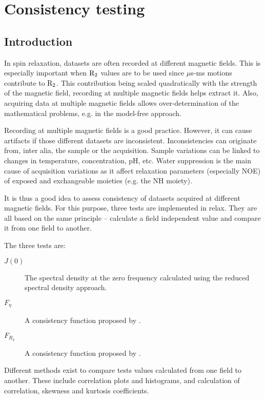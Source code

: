 
\chapter{Consistency testing}



\section{Introduction}

In spin relaxation, datasets are often recorded at different magnetic fields.  This is especially important when $\mathrm{R}_2$ values are to be used since $\mu$s-ms motions contribute to $\mathrm{R}_2$.  This contribution being scaled quadratically with the strength of the magnetic field, recording at multiple magnetic fields helps extract it.  Also, acquiring data at multiple magnetic fields allows over-determination of the mathematical problems, e.g. in the model-free approach.

Recording at multiple magnetic fields is a good practice.  However, it can cause artifacts if those different datasets are inconsistent.  Inconsistencies can originate from, inter alia, the sample or the acquisition.  Sample variations can be linked to changes in temperature, concentration, pH, etc.  Water suppression is the main cause of acquisition variations as it affect relaxation parameters (especially NOE) of exposed and exchangeable moieties (e.g. the NH moiety).

It is thus a good idea to assess consistency of datasets acquired at different magnetic fields.  For this purpose, three tests are implemented in relax.  They are all based on the same principle -- calculate a field independent value and compare it from one field to another.

The three tests are:

\begin{description}
\item[$J(0)$]  The spectral density at the zero frequency calculated using the reduced spectral density approach.
\item[$F_\eta$]  A consistency function proposed by \citet{Fushman98}.
\item[$F_{R_2}$]  A consistency function proposed by \citet{Fushman98}.
\end{description}

Different methods exist to compare tests values calculated from one field to another.  These include correlation plots and histograms, and calculation of correlation, skewness and kurtosis coefficients.

